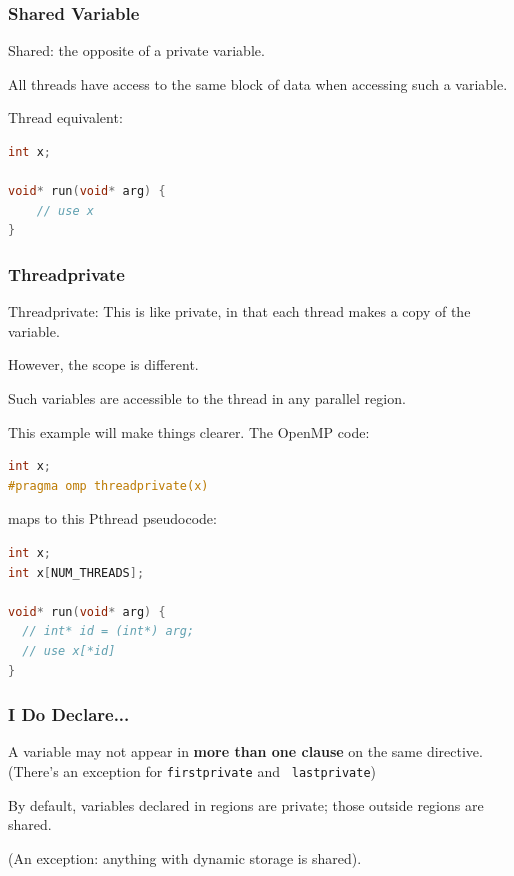 \begin{frame}[fragile]
\frametitle{Shared Variable}

Shared: the opposite of a private variable.
 
All threads have access to the same block of data when accessing such a variable.

Thread equivalent:

  \begin{lstlisting}[language=C]
int x;

void* run(void* arg) {
    // use x
}
  \end{lstlisting}

\end{frame}


\begin{frame}[fragile]
\frametitle{Threadprivate}

Threadprivate: This is like private, in that each thread makes a copy of the variable. 

However, the scope 
is different. 

Such variables are accessible to the thread in any parallel region.

This example will make things clearer. The OpenMP code:
  \begin{lstlisting}[language=C]
int x;
#pragma omp threadprivate(x)
  \end{lstlisting}
  maps to this Pthread pseudocode:
  \begin{lstlisting}[language=C]
int x;
int x[NUM_THREADS];

void* run(void* arg) {
  // int* id = (int*) arg;
  // use x[*id]
}
  \end{lstlisting}



\end{frame}


\begin{frame}
\frametitle{I Do Declare...}

A variable may not appear in {\bf more than one clause} on the same
directive. 
(There's an exception for {\tt firstprivate} and {\tt
  lastprivate}) 
  
  By default, variables
declared in regions are private; those outside regions are
shared. 

(An exception: anything with dynamic storage is
shared).

\end{frame}


